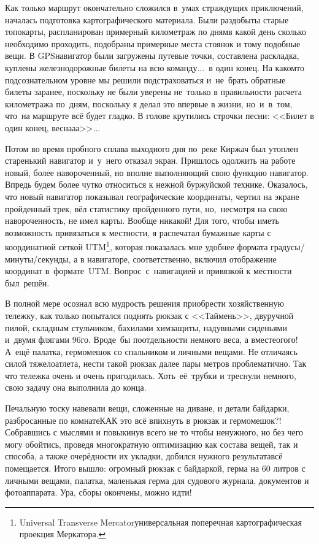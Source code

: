 Как только маршрут окончательно сложился в~умах страждущих приключений, началась подготовка картографического материала. Были раздобыты старые топокарты, распланирован примерный километраж по дням\mdash в какой день сколько необходимо проходить, подобраны примерные места стоянок и тому подобные вещи. В GPS\sdash навигатор были загружены путевые точки, составлена раскладка, куплены железнодорожные билеты на всю команду$\ldots$~в один конец. На каком\sdash то подсознательном уровне мы решили подстраховаться и~не~брать обратные билеты заранее, поскольку не были уверены не~только в правильности расчета километража по~дням, поскольку я делал это впервые в жизни, но~и~в~том, что~на маршруте всё будет гладко. В голове крутились строчки песни: <<Билет в один конец, весна\sdash а\sdash а>>$\ldots$

\renewcommand*{\thefootnote}{\fnsymbol{footnote}}
Потом во время пробного сплава выходного дня по~реке Киржач был утоплен старенький навигатор и~у~него отказал экран. Пришлось одолжить на работе новый, более навороченный, но вполне выполняющий свою функцию навигатор. Впредь будем более чутко относиться к нежной буржуйской технике. Оказалось, что новый навигатор показывал географические координаты, чертил на экране пройденный трек, вёл статистику пройденного пути, но,~несмотря на свою навороченность, не имел карты. Вообще никакой! Для того, чтобы иметь возможность привязаться к местности, я распечатал бумажные карты с координатной сеткой UTM\footnote{Universal Transverse Mercator\mdash универсальная поперечная картографическая проекция Меркатора.}, которая показалась мне удобнее формата градусы/минуты/секунды, а в навигаторе, соответственно, включил отображение координат в~формате~UTM. Вопрос~с~навигацией и привязкой к местности был~решён.

В полной мере осознал всю мудрость решения приобрести хозяйственную тележку, как только попытался поднять рюкзак с <<Таймень>>, двуручной пилой, складным стульчиком, бахилами химзащиты, надувными сиденьями и~двумя флягами 96\sdash го. Вроде~бы по\sdash отдельности немного веса, а вместе\mdash ого\sdash го! А~ещё палатка, гермомешок со спальником и личными вещами. Не отличаясь силой тяжелоатлета, нести такой рюкзак далее пары метров проблематично. Так что тележка очень и очень пригодилась. Хоть~её~трубки и треснули немного, свою задачу она выполнила до конца.

Печальную тоску навевали вещи, сложенные на диване, и детали байдарки, разбросанные по комнате\mdash КАК это всё впихнуть в рюкзак и гермомешок?! Собравшись с мыслями и повыкинув всего не то чтобы ненужного, но без чего могу обойтись, проведя многократную оптимизацию как состава вещей, так и способа, а также очерёдности их укладки, добился нужного результата\mdash всё помещается. Итого вышло: огромный рюкзак с байдаркой, герма на 60 литров с личными вещами, палатка, маленькая герма для судового журнала, документов и фотоаппарата. Ура, сборы окончены, можно идти!

